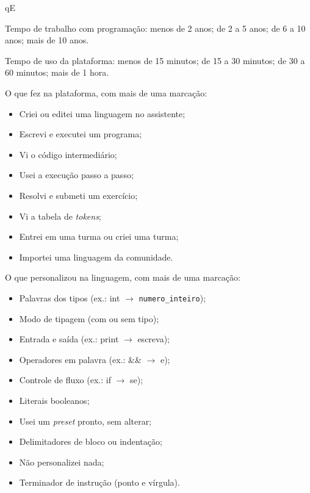 \begin{questoes}{qE}
    \item\label{qE:uso-ini} Tempo de trabalho com programação: menos de 2 anos; de 2 a 5 anos; de 6 a 10 anos; mais de 10 anos.
    \item Tempo de uso da plataforma: menos de 15 minutos; de 15 a 30 minutos; de 30 a 60 minutos; mais de 1 hora.
    \item O que fez na plataforma, com mais de uma marcação:

    \begin{itemize}
        \item Criei ou editei uma linguagem no assistente;
        \item Escrevi e executei um programa;
        \item Vi o código intermediário;
        \item Usei a execução passo a passo;
        \item Resolvi e submeti um exercício;
        \item Vi a tabela de \textit{tokens};
        \item Entrei em uma turma ou criei uma turma;
        \item Importei uma linguagem da comunidade.
    \end{itemize}

    \item\label{qE:uso-fim} O que personalizou na linguagem, com mais de uma marcação:

    \begin{itemize}
        \item Palavras dos tipos (ex.: int $\rightarrow$ \texttt{numero\_inteiro});
        \item Modo de tipagem (com ou sem tipo);
        \item Entrada e saída (ex.: print $\rightarrow$ escreva);
        \item Operadores em palavra (ex.: \&\& $\rightarrow$ e);
        \item Controle de fluxo (ex.: if $\rightarrow$ se);
        \item Literais booleanos;
        \item Usei um \textit{preset} pronto, sem alterar;
        \item Delimitadores de bloco ou indentação;
        \item Não personalizei nada;
        \item Terminador de instrução (ponto e vírgula).
    \end{itemize}
\end{questoes}


